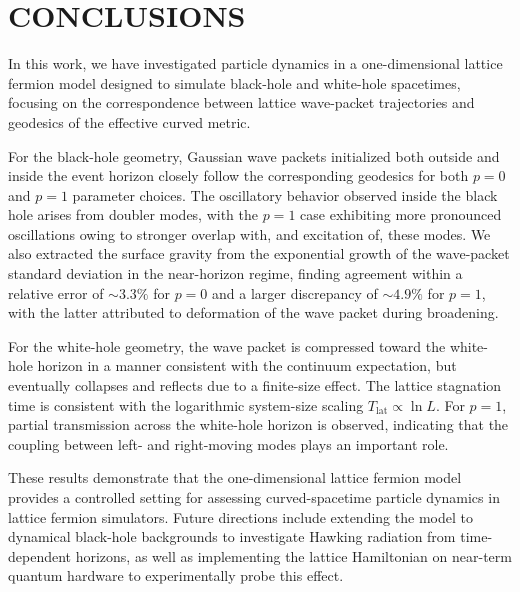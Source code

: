 \documentclass[reprint,amsmath,amssymb,aps,showkeys,superscriptaddress]{revtex4-2}
\begin{document}
\section{CONCLUSIONS}
In this work, we have investigated particle dynamics in a one-dimensional lattice fermion model designed to simulate black-hole and white-hole spacetimes, focusing on the correspondence between lattice wave-packet trajectories and geodesics of the effective curved metric.

For the black-hole geometry, Gaussian wave packets initialized both outside and inside the event horizon closely follow the corresponding geodesics for both $p=0$ and $p=1$ parameter choices. The oscillatory behavior observed inside the black hole arises from doubler modes, with the $p=1$ case exhibiting more pronounced oscillations owing to stronger overlap with, and excitation of, these modes. We also extracted the surface gravity from the exponential growth of the wave-packet standard deviation in the near-horizon regime, finding agreement within a relative error of $\sim 3.3\%$ for $p=0$ and a larger discrepancy of $\sim 4.9\%$ for $p=1$, with the latter attributed to deformation of the wave packet during broadening.

For the white-hole geometry, the wave packet is compressed toward the white-hole horizon in a manner consistent with the continuum expectation, but eventually collapses and reflects due to a finite-size effect. The lattice stagnation time is consistent with the logarithmic system-size scaling $T_{\mathrm{lat}}\propto\ln L$. For $p=1$, partial transmission across the white-hole horizon is observed, indicating that the coupling between left- and right-moving modes plays an important role.

These results demonstrate that the one-dimensional lattice fermion model provides a controlled setting for assessing curved-spacetime particle dynamics in lattice fermion simulators. Future directions include extending the model to dynamical black-hole backgrounds to investigate Hawking radiation from time-dependent horizons, as well as implementing the lattice Hamiltonian on near-term quantum hardware to experimentally probe this effect.


\end{document}
